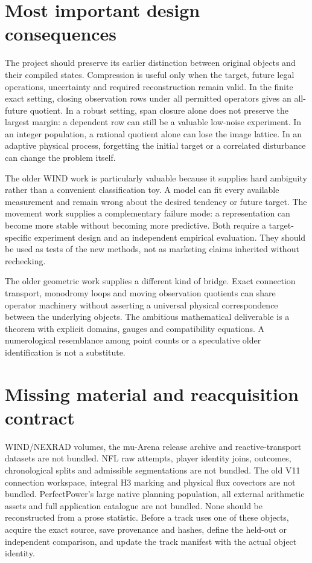 \documentclass[
  11pt,
  a4paper,
]{report}
\begin{document}
\hypertarget{most-important-design-consequences}{%
\section{Most important design
consequences}\label{most-important-design-consequences}}

The project should preserve its earlier distinction between original
objects and their compiled states. Compression is useful only when the
target, future legal operations, uncertainty and required reconstruction
remain valid. In the finite exact setting, closing observation rows
under all permitted operators gives an all-future quotient. In a robust
setting, span closure alone does not preserve the largest margin: a
dependent row can still be a valuable low-noise experiment. In an
integer population, a rational quotient alone can lose the image
lattice. In an adaptive physical process, forgetting the initial target
or a correlated disturbance can change the problem itself.

The older WIND work is particularly valuable because it supplies hard
ambiguity rather than a convenient classification toy. A model can fit
every available measurement and remain wrong about the desired tendency
or future target. The movement work supplies a complementary failure
mode: a representation can become more stable without becoming more
predictive. Both require a target-specific experiment design and an
independent empirical evaluation. They should be used as tests of the
new methods, not as marketing claims inherited without rechecking.

The older geometric work supplies a different kind of bridge. Exact
connection transport, monodromy loops and moving observation quotients
can share operator machinery without asserting a universal physical
correspondence between the underlying objects. The ambitious
mathematical deliverable is a theorem with explicit domains, gauges and
compatibility equations. A numerological resemblance among point counts
or a speculative older identification is not a substitute.

\hypertarget{missing-material-and-reacquisition-contract}{%
\section{Missing material and reacquisition
contract}\label{missing-material-and-reacquisition-contract}}

WIND/NEXRAD volumes, the mu-Arena release archive and reactive-transport
datasets are not bundled. NFL raw attempts, player identity joins,
outcomes, chronological splits and admissible segmentations are not
bundled. The old V11 connection workspace, integral H3 marking and
physical flux covectors are not bundled. PerfectPower's large native
planning population, all external arithmetic assets and full application
catalogue are not bundled. None should be reconstructed from a prose
statistic. Before a track uses one of these objects, acquire the exact
source, save provenance and hashes, define the held-out or independent
comparison, and update the track manifest with the actual object
identity.
\end{document}

